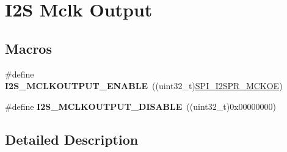 \hypertarget{group___i2_s___m_c_l_k___output}{}\section{I2S Mclk Output}
\label{group___i2_s___m_c_l_k___output}
\subsection*{Macros}
\begin{DoxyCompactItemize}
\item 
\#define {\bfseries I2\+S\+\_\+\+M\+C\+L\+K\+O\+U\+T\+P\+U\+T\+\_\+\+E\+N\+A\+B\+LE}~((uint32\+\_\+t)\hyperlink{group___peripheral___registers___bits___definition_ga25669c3686c0c577d2d371ac09200ff0}{S\+P\+I\+\_\+\+I2\+S\+P\+R\+\_\+\+M\+C\+K\+OE})\hypertarget{group___i2_s___m_c_l_k___output_gad02b0b79e2a7b8786228bbd902db6266}{}\label{group___i2_s___m_c_l_k___output_gad02b0b79e2a7b8786228bbd902db6266}

\item 
\#define {\bfseries I2\+S\+\_\+\+M\+C\+L\+K\+O\+U\+T\+P\+U\+T\+\_\+\+D\+I\+S\+A\+B\+LE}~((uint32\+\_\+t)0x00000000)\hypertarget{group___i2_s___m_c_l_k___output_gad751d9da31ef7b7b63b5a4028331f36d}{}\label{group___i2_s___m_c_l_k___output_gad751d9da31ef7b7b63b5a4028331f36d}

\end{DoxyCompactItemize}


\subsection{Detailed Description}
